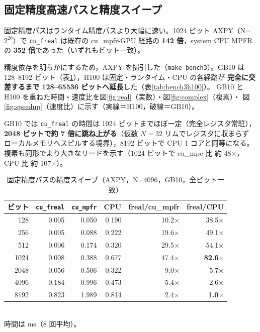 \documentclass[uplatex,dvipdfmx,a4paper,11pt]{jsarticle}
\newcommand{\code}[1]{\texttt{#1}}
\begin{document}
\subsection{固定精度高速パスと精度スイープ}
\label{sec:sweep}

固定精度パスはランタイム精度パスより大幅に速い。1024 ビット AXPY（N=$2^{20}$）で
\code{cu\_freal} は既存の cu\_mpfr-GPU 経路の \textbf{142 倍}，system CPU MPFR の
\textbf{352 倍}であった（いずれもビット一致）。

精度依存を明らかにするため，AXPY を掃引した（\code{make bench3}）。GB10 は
128--8192 ビット（表\ref{tab:bench3}），H100 は固定・ランタイム・CPU の各経路が
\textbf{完全に交差するまで 128--65536 ビットへ延長}した（表\ref{tab:bench3h100}）。
GB10 と H100 を重ねた時間・速度比を図\ref{fig:real}（実数）・図\ref{fig:complex}（複素）・
図\ref{fig:speedup}（速度比）に示す（実線＝H100，破線＝GB10）。

GB10 では \code{cu\_freal} の時間は 1024 ビットまでほぼ一定（完全レジスタ常駐），
\textbf{2048 ビットで約 7 倍に跳ね上がる}（仮数 $N=32$ リムでレジスタに収まらず
ローカルメモリへスピルする境界），8192 ビットで CPU 1 コアと同等になる。
複素も同形でより大きなリードを示す（1024 ビットで cu\_mpc 比 約 48$\times$，CPU 比 約 107$\times$）。

\begin{table}[h]
\centering
\caption{固定精度パスの精度スイープ（AXPY，N=4096，GB10，全ビット一致）}
\label{tab:bench3}
\begin{tabular}{rrrrrr}
\toprule
ビット & \code{cu\_freal} & \code{cu\_mpfr} & CPU & freal/cu\_mpfr & freal/CPU \\
\midrule
128  & 0.005 & 0.050 & 0.190 & 10.2$\times$ & 38.5$\times$ \\
256  & 0.005 & 0.088 & 0.222 & 19.6$\times$ & 49.1$\times$ \\
512  & 0.006 & 0.174 & 0.320 & 29.5$\times$ & 54.1$\times$ \\
1024 & 0.008 & 0.388 & 0.677 & 47.4$\times$ & \textbf{82.6$\times$} \\
2048 & 0.056 & 0.506 & 0.322 & 9.0$\times$  & 5.7$\times$ \\
4096 & 0.184 & 0.996 & 0.473 & 5.4$\times$  & 2.6$\times$ \\
8192 & 0.823 & 1.989 & 0.814 & 2.4$\times$  & \textbf{1.0$\times$} \\
\bottomrule
\end{tabular}\\[2pt]
\footnotesize 時間は ms（8 回平均）。
\end{table}
\end{document}
